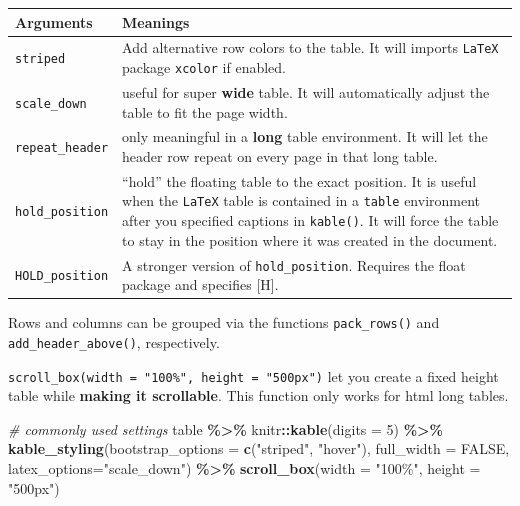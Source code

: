\documentclass[
  a4paper,
  twoside,
  openright]{book}
\newenvironment{Shaded}{\begin{snugshade}}{\end{snugshade}}
\newcommand{\AttributeTok}[1]{\textcolor[rgb]{0.13,0.29,0.53}{#1}}
\newcommand{\CommentTok}[1]{\textcolor[rgb]{0.56,0.35,0.01}{\textit{#1}}}
\newcommand{\ConstantTok}[1]{\textcolor[rgb]{0.56,0.35,0.01}{#1}}
\newcommand{\DecValTok}[1]{\textcolor[rgb]{0.00,0.00,0.81}{#1}}
\newcommand{\FunctionTok}[1]{\textcolor[rgb]{0.13,0.29,0.53}{\textbf{#1}}}
\newcommand{\NormalTok}[1]{#1}
\newcommand{\SpecialCharTok}[1]{\textcolor[rgb]{0.81,0.36,0.00}{\textbf{#1}}}
\newcommand{\StringTok}[1]{\textcolor[rgb]{0.31,0.60,0.02}{#1}}
\theoremstyle{definition}
\theoremstyle{definition}
\theoremstyle{definition}
\theoremstyle{definition}
\theoremstyle{remark}
\begin{document}
\begin{itemize}
  \begin{longtable}[]{@{}
    >{\raggedright\arraybackslash}p{}
    >{\raggedright\arraybackslash}p{}@{}}
  \toprule\noalign{}
  \begin{minipage}[b]{\linewidth}\raggedright
  Arguments
  \end{minipage} & \begin{minipage}[b]{\linewidth}\raggedright
  Meanings
  \end{minipage} \\
  \midrule\noalign{}
  \endhead
  \bottomrule\noalign{}
  \endlastfoot
  \texttt{striped} & Add alternative row colors to the table. It will imports \texttt{LaTeX} package \texttt{xcolor} if enabled. \\
  \texttt{scale\_down} & useful for super \textbf{wide} table. It will automatically adjust the table to {fit the page width}. \\
  \texttt{repeat\_header} & only meaningful in a \textbf{long} table environment. It will let the header row repeat on every page in that long table. \\
  \texttt{hold\_position} & ``hold'' the floating table to the exact position. It is useful when the \texttt{LaTeX} table is contained in a \texttt{table} environment after you specified captions in \texttt{kable()}. It will force the table to stay in the position where it was created in the document. \\
  \texttt{HOLD\_position} & A stronger version of \texttt{hold\_position}. Requires the float package and specifies ⁠{[}H{]}⁠. \\
  \end{longtable}
\end{itemize}

Rows and columns can be grouped via the functions \texttt{pack\_rows()} and \texttt{add\_header\_above()}, respectively.

\texttt{scroll\_box(width\ =\ "100\%",\ height\ =\ "500px")} let you create a fixed height table while \textbf{making it scrollable}. This function only works for html long tables.

\begin{Shaded}
\begin{Highlighting}[]
\CommentTok{\# commonly used settings }
\NormalTok{table }\SpecialCharTok{\%\textgreater{}\%} 
\NormalTok{    knitr}\SpecialCharTok{::}\FunctionTok{kable}\NormalTok{(}\AttributeTok{digits =} \DecValTok{5}\NormalTok{) }\SpecialCharTok{\%\textgreater{}\%}
    \FunctionTok{kable\_styling}\NormalTok{(}\AttributeTok{bootstrap\_options =} \FunctionTok{c}\NormalTok{(}\StringTok{"striped"}\NormalTok{, }\StringTok{"hover"}\NormalTok{), }\AttributeTok{full\_width =} \ConstantTok{FALSE}\NormalTok{, }\AttributeTok{latex\_options=}\StringTok{"scale\_down"}\NormalTok{) }\SpecialCharTok{\%\textgreater{}\%} 
    \FunctionTok{scroll\_box}\NormalTok{(}\AttributeTok{width =} \StringTok{"100\%"}\NormalTok{, }\AttributeTok{height =} \StringTok{"500px"}\NormalTok{)}
\end{Highlighting}
\end{Shaded}
\end{document}
